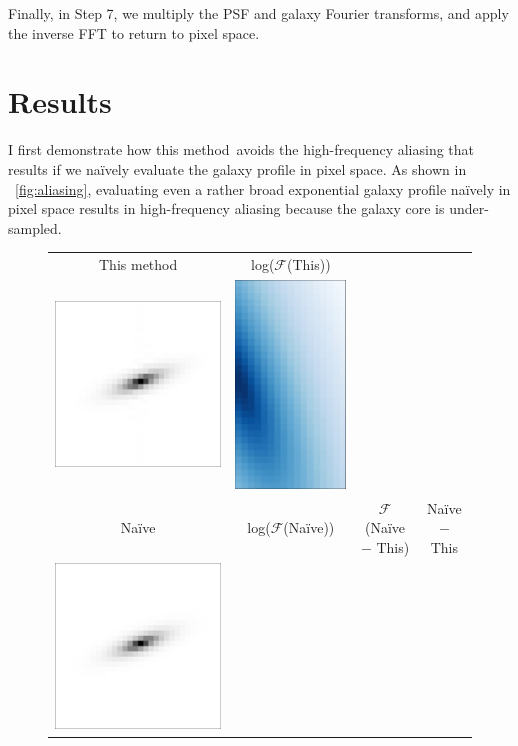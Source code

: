 \documentclass[11pt,preprint]{aastex}
\newcommand{\figref}[1]{\figurename~\ref{#1}}
\newcommand{\trick}{method}
\begin{document}
Finally, in Step 7, we multiply the PSF and galaxy Fourier transforms,
and apply the inverse FFT to return to pixel space.


\section{Results}

I first demonstrate how this \trick\ avoids the high-frequency
aliasing that results if we na\"ively evaluate the galaxy profile in
pixel space.  As shown in \figref{fig:aliasing}, evaluating even a
rather broad exponential galaxy profile na\"ively in pixel space
results in high-frequency aliasing because the galaxy core is
under-sampled.


\begin{figure}
  \newcommand{\F}{$\mathcal{F}$}
  \begin{center}
    \begin{tabular}{@{}ccccc@{}}
      This method
      &
      log(\F(This))
      &
      \\
      \includegraphics[height=0.24\textwidth]{lopass-mine-pix}
      &
      \includegraphics[height=0.24\textwidth]{lopass-mine-logfourier}
      &
      \\
      Na\"ive
      & log(\F(Na\"ive))
      &
      \multicolumn{2}{c}{\F(Na\"ive $-$ This)}
      & Na\"ive $-$ This
      \\
      \includegraphics[height=0.24\textwidth]{lopass-naive-pix}

\end{tabular}
\end{center}
\end{figure}
\end{document}
